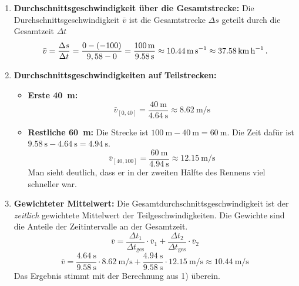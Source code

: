 \documentclass[ngerman]{scrreprt}
\newenvironment{loesungbox}[1]
  {\needspace{5\baselineskip}\begin{loesungboxstyle}[frametitle={#1}]}
  {\end{loesungboxstyle}}
\begin{document}
\begin{loesungbox}{Lösung zu \Cref{aufg:laeufer}}
\begin{enumerate}
    \item \textbf{Durchschnittsgeschwindigkeit über die Gesamtstrecke:}
    Die Durchschnittsgeschwindigkeit $\bar{v}$ ist die Gesamtstrecke $\Delta s$ geteilt durch die Gesamtzeit $\Delta t$
    \begin{equation}
        \bar{v} = \frac{\Delta s}{\Delta t} = \frac{0-(-100)}{9,58-0} = \frac{\SI{100}{\meter}}{\SI{9.58}{\second}} \approx \SI{10.44}{\meter\per\second} \approx \SI{37.58}{\kilo\meter\per\hour} \,.
    \end{equation}
    
    \item \textbf{Durchschnittsgeschwindigkeiten auf Teilstrecken:}
    \begin{itemize}
        \item \textbf{Erste \SI{40}{\meter}:}
        \begin{equation}
            \bar{v}_{[0,40]} = \frac{\SI{40}{\meter}}{\SI{4.64}{\second}} \approx \SI{8.62}{\meter\per\second}
        \end{equation}
        \item \textbf{Restliche \SI{60}{\meter}:} Die Strecke ist $\SI{100}{\meter} - \SI{40}{\meter} = \SI{60}{\meter}$. Die Zeit dafür ist $\SI{9.58}{\second} - \SI{4.64}{\second} = \SI{4.94}{\second}$.
        \begin{equation}
            \bar{v}_{[40,100]} = \frac{\SI{60}{\meter}}{\SI{4.94}{\second}} \approx \SI{12.15}{\meter\per\second}
        \end{equation}
        Man sieht deutlich, dass er in der zweiten Hälfte des Rennens viel schneller war.
    \end{itemize}
    
    \item \textbf{Gewichteter Mittelwert:}
    Die Gesamtdurchschnittsgeschwindigkeit ist der \textit{zeitlich} gewichtete Mittelwert der Teilgeschwindigkeiten. Die Gewichte sind die Anteile der Zeitintervalle an der Gesamtzeit.
    \begin{equation}
        \bar{v} = \frac{\Delta t_1}{\Delta t_{\text{ges}}} \cdot \bar{v}_1 + \frac{\Delta t_2}{\Delta t_{\text{ges}}} \cdot \bar{v}_2
    \end{equation}
    \begin{equation}
        \bar{v} = \frac{\SI{4.64}{\second}}{\SI{9.58}{\second}} \cdot \SI{8.62}{\meter\per\second} + \frac{\SI{4.94}{\second}}{\SI{9.58}{\second}} \cdot \SI{12.15}{\meter\per\second} \approx \SI{10.44}{\meter\per\second}
    \end{equation}
    Das Ergebnis stimmt mit der Berechnung aus 1) überein.
    

\end{enumerate}
\end{loesungbox}
\end{document}
